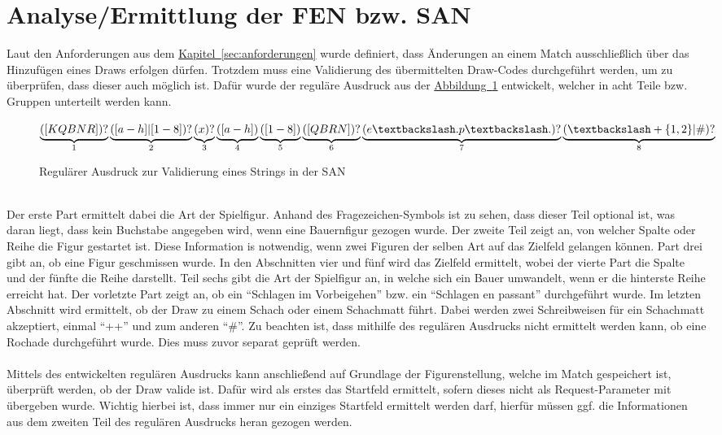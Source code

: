 \section{Analyse/Ermittlung der FEN bzw. SAN}
Laut den Anforderungen aus dem \hyperref[sec:anforderungen]{Kapitel~\ref{sec:anforderungen}} wurde definiert, dass Änderungen an einem Match ausschließlich über das Hinzufügen eines Draws erfolgen dürfen. Trotzdem muss eine Validierung des übermittelten Draw-Codes durchgeführt werden, um zu überprüfen, dass dieser auch möglich ist. Dafür wurde der reguläre Ausdruck aus der \hyperref[fig:regexSAN]{Abbildung~\ref{fig:regexSAN}} entwickelt, welcher in acht Teile bzw. Gruppen unterteilt werden kann.\\
\begin{figure}
	$\underbrace{([KQBNR])?}_{1}\underbrace{([a-h]|[1-8])?}_{2}\underbrace{(x)?}_{3}\underbrace{([a-h])}_{4}\underbrace{([1-8])}_{5}\underbrace{([QBRN])?}_{6}\underbrace{(e\textbackslash.p\textbackslash.)?}_{7}\underbrace{(\textbackslash+\{1,2\}|\#)?}_{8}$
\caption{Regulärer Ausdruck zur Validierung eines Strings in der SAN}
\label{fig:regexSAN}
\end{figure}
\\
Der erste Part ermittelt dabei die Art der Spielfigur. Anhand des Fragezeichen-Symbols ist zu sehen, dass dieser Teil optional ist, was daran liegt, dass kein Buchstabe angegeben wird, wenn eine Bauernfigur gezogen wurde. Der zweite Teil zeigt an, von welcher Spalte oder Reihe die Figur gestartet ist. Diese Information is notwendig, wenn zwei Figuren der selben Art auf das Zielfeld gelangen können. Part drei gibt an, ob eine Figur geschmissen wurde. In den Abschnitten vier und fünf wird das Zielfeld ermittelt, wobei der vierte Part die Spalte und der fünfte die Reihe darstellt. Teil sechs gibt die Art der Spielfigur an, in welche sich ein Bauer umwandelt, wenn er die hinterste Reihe erreicht hat. Der vorletzte Part zeigt an, ob ein \enquote{Schlagen im Vorbeigehen} bzw. ein \enquote{Schlagen en passant} durchgeführt wurde. Im letzten Abschnitt wird ermittelt, ob der Draw zu einem Schach oder einem Schachmatt führt. Dabei werden zwei Schreibweisen für ein Schachmatt akzeptiert, einmal \enquote{++} und zum anderen \enquote{\#}. Zu beachten ist, dass mithilfe des regulären Ausdrucks nicht ermittelt werden kann, ob eine Rochade durchgeführt wurde. Dies muss zuvor separat geprüft werden.\\
\\
Mittels des entwickelten regulären Ausdrucks kann anschließend auf Grundlage der Figurenstellung, welche im Match gespeichert ist, überprüft werden, ob der Draw valide ist. Dafür wird als erstes das Startfeld ermittelt, sofern dieses nicht als Request-Parameter mit übergeben wurde. Wichtig hierbei ist, dass immer nur ein einziges Startfeld ermittelt werden darf, hierfür müssen ggf. die Informationen aus dem zweiten Teil des regulären Ausdrucks heran gezogen werden. \\
